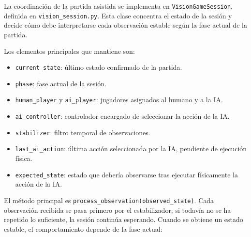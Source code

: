La coordinación de la partida asistida se implementa en \texttt{VisionGameSession}, definida en \texttt{vision\_session.py}. Esta clase concentra el estado de la sesión y decide cómo debe interpretarse cada observación estable según la fase actual de la partida.

Los elementos principales que mantiene son:

\begin{itemize}
    \item \texttt{current\_state}: último estado confirmado de la partida.
    \item \texttt{phase}: fase actual de la sesión.
    \item \texttt{human\_player} y \texttt{ai\_player}: jugadores asignados al humano y a la IA.
    \item \texttt{ai\_controller}: controlador encargado de seleccionar la acción de la IA.
    \item \texttt{stabilizer}: filtro temporal de observaciones.
    \item \texttt{last\_ai\_action}: última acción seleccionada por la IA, pendiente de ejecución física.
    \item \texttt{expected\_state}: estado que debería observarse tras ejecutar físicamente la acción de la IA.
\end{itemize}

El método principal es \texttt{process\_observation(observed\_state)}. Cada observación recibida se pasa primero por el estabilizador; si todavía no se ha repetido lo suficiente, la sesión continúa esperando. Cuando se obtiene un estado estable, el comportamiento depende de la fase actual:

